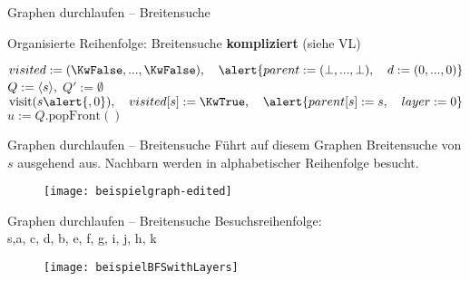 \begin{frame}{Graphen durchlaufen – Breitensuche}
	\vspace{-.3\baselineskip}
	\begin{exampleblock}{Organisierte Reihenfolge: Breitensuche \textbf{kompliziert} (siehe VL) }
		\begin{algorithm}[H]
			\small \vspace{-.4\baselineskip}
			 {
				$visited := (\KwFalse, ... , \KwFalse), \quad \alert{parent := (\bot, ..., \bot), \quad d := (0, ..., 0)}$\;
				$Q := \langle s \rangle,$ \quad \alert{$Q' := \emptyset$}   \;
				$\|visit|(s\alert{, 0}), \quad visited[s] := \KwTrue, \quad \alert{parent[s] := s, \quad layer := 0}$ \;
				 {
					$u := Q.\text{popFront}()$\;
					\alert{
					} \vspace{-.2\baselineskip}
				} \vspace{-.2\baselineskip}
			}
		\end{algorithm} \vspace{-.5\baselineskip}
	\end{exampleblock}
\end{frame}




\begin{frame}{Graphen durchlaufen – Breitensuche}
	Führt auf diesem Graphen Breitensuche von $s$ ausgehend aus. Nachbarn werden in alphabetischer Reihenfolge besucht.
	\vspace{-.3\baselineskip}
	\begin{figure}[htp]
		\centering
		\texttt{[image: beispielgraph-edited]}
	\end{figure}
\end{frame}

\begin{frame}{Graphen durchlaufen – Breitensuche}
	\solutionheading
	Besuchsreihenfolge: \\ s,\quad a, c, d, \quad b, e, f, g, i, j, \quad h, k
	\vspace{-.3\baselineskip}
	\begin{figure}[htp]
		\centering
		\texttt{[image: beispielBFSwithLayers]}
	\end{figure}
\end{frame}

